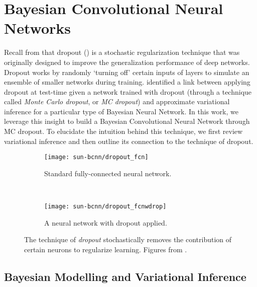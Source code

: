\section{Bayesian Convolutional Neural Networks}

Recall from  that dropout () is a stochastic regularization technique that was originally designed to improve the generalization performance of deep networks. Dropout works by randomly `turning off' certain inputs of layers to simulate an ensemble of smaller networks during training. \cite{Gal2016CNN} identified a link between applying dropout at test-time given a network trained with dropout (through a technique called \textit{Monte Carlo dropout}, or \textit{MC dropout}) and approximate variational inference for a particular type of Bayesian Neural Network. In this work, we leverage this insight to build a Bayesian Convolutional Neural Network through MC dropout. To elucidate the intuition behind this technique, we first review variational inference and then outline its connection to the technique of dropout. 


\begin{figure}
\centering
\begin{subfigure}{0.45\textwidth}
	\centering
    \texttt{[image: sun-bcnn/dropout\_fcn]}
    \caption{Standard fully-connected neural network.}
\end{subfigure}
~
\begin{subfigure}{0.45\textwidth}
	\centering
    \texttt{[image: sun-bcnn/dropout\_fcnwdrop]}
    \caption{A neural network with dropout applied.}
\end{subfigure}
\caption{The technique of \textit{dropout} stochastically removes the contribution of certain neurons to regularize learning. Figures	 from \cite{srivastava_dropout_2014}.}
\label{fig:sun-bcnn_fcn_dropout}
\end{figure}

\subsection{Bayesian Modelling and Variational Inference}

